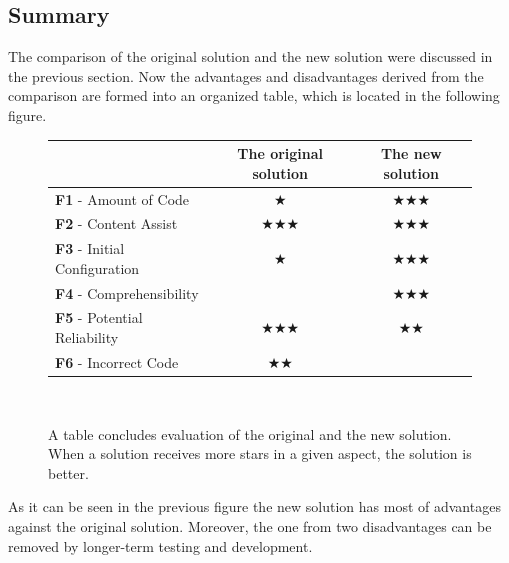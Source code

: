 \documentclass[12pt,notitlepage,a4paper]{report}
\begin{document}
\subsection{Summary}
The comparison of the original solution and the new solution were discussed in the previous section. Now the advantages and disadvantages derived from the comparison are formed into an organized table, which is located in the following figure. 

\begin{figure}[h!]
\centering
\caption{A table concludes evaluation of the original and the new solution. When a solution receives more stars in a given aspect, the solution is better.}
	\begin{tabular}{| l | c | c |}
		\hline
		 &
			\textbf{The original solution} &
			\textbf{The new solution}
			\\
		\hline
		\textbf{F1} - Amount of Code & $\bigstar$ & $\bigstar\bigstar\bigstar$ \\
	           \textbf{F2} - Content Assist & $\bigstar\bigstar\bigstar$ & $\bigstar\bigstar\bigstar$ \\
		\textbf{F3} - Initial Configuration & $\bigstar$ & $\bigstar\bigstar\bigstar$ \\
		\textbf{F4} - Comprehensibility &   & $\bigstar\bigstar\bigstar$ \\
		\textbf{F5} - Potential Reliability & $\bigstar\bigstar\bigstar$ & $\bigstar\bigstar$ \\
		\textbf{F6} - Incorrect Code & $\bigstar\bigstar$ &  \\
		\hline
	\end{tabular} \\
\label{ComparisionTable}
\end{figure}
As it can be seen in the previous figure the new solution has most of advantages against the original solution. Moreover, the one from two disadvantages can be removed by longer-term testing and development.
\end{document}
